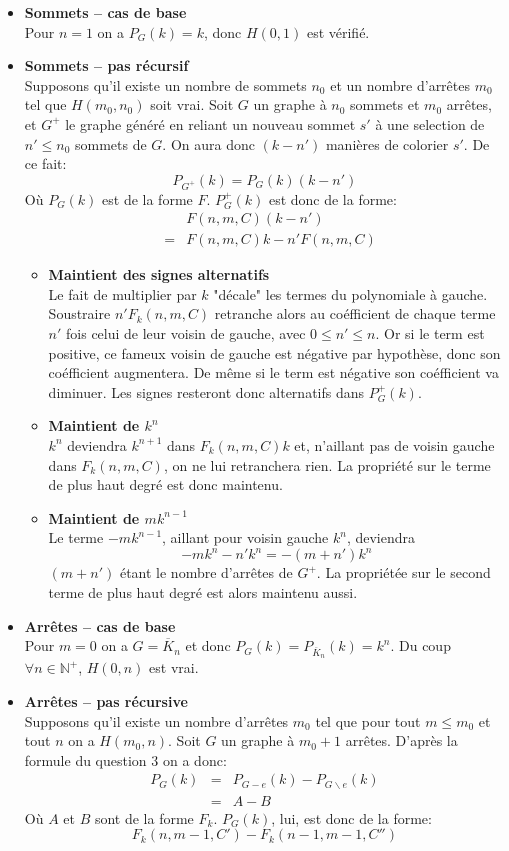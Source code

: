 \begin{itemize}
\item \textbf{Sommets -- cas de base} \\
Pour $n = 1$ on a $P_G(k) = k$, donc $H(0,1)$ est vérifié.
\item \textbf{Sommets -- pas récursif} \\ Supposons qu'il existe un nombre de sommets $n_0$ et un nombre d'arrêtes $m_0$ tel que $H(m_0,n_0)$ soit vrai. Soit $G$ un graphe à $n_0$ sommets et $m_0$ arrêtes, et $G^+$ le graphe généré en reliant un nouveau sommet $s'$ à une selection de $n' \leq n_0$ sommets de $G$. On aura donc $(k-n')$ manières de colorier $s'$. De ce fait:
\[ P_{G^+}(k) = P_G(k)(k-n') \]
Où $P_G(k)$ est de la forme $F$. $P_G^+(k)$ est donc de la forme:
\begin{eqnarray*}
&&	F(n,m,C)(k-n')			\\
&=& F(n,m,C)k - n'F(n,m,C)	
\end{eqnarray*} 
\begin{itemize}
\item \textbf{Maintient des signes alternatifs} \\ 
Le fait de multiplier par $k$ "décale" les termes du polynomiale à gauche. Soustraire $n'F_k(n,m,C)$ retranche alors au coéfficient de chaque terme $n'$ fois celui de leur voisin de gauche, avec $0 \leq n' \leq n$. Or si le term est positive, ce fameux voisin de gauche est négative par hypothèse, donc son coéfficient augmentera. De même si le term est négative son coéfficient va diminuer. Les signes resteront donc alternatifs dans $P_G^+(k)$.
\item \textbf{Maintient de $k^n$} \\
$k^{n}$ deviendra $k^{n+1}$ dans $F_k(n,m,C)k$ et, n'aillant pas de voisin gauche dans $F_k(n,m,C)$, on ne lui retranchera rien. La propriété sur le terme de plus haut degré est donc maintenu.
\item \textbf{Maintient de $mk^{n-1}$} \\
Le terme $-mk^{n-1}$, aillant pour voisin gauche $k^n$, deviendra \[-mk^n - n'k^n = -(m+n')k^n \] $(m+n')$ étant le nombre d'arrêtes de $G^+$. La propriétée sur le second terme de plus haut degré est alors maintenu aussi.
\end{itemize}

\item \textbf{Arrêtes -- cas de base} \\
Pour $m = 0$ on a $G = \overline{K}_n$ et donc $P_G(k) = P_{\overline{K}_n}(k) = k^n$. Du coup $\forall n \in \mathbb{N^+}$, $H(0,n)$ est vrai.
\item \textbf{Arrêtes -- pas récursive} \\
Supposons qu'il existe un nombre d'arrêtes $m_0$ tel que pour tout $m \leq m_0$ et tout $n$ on a $H(m_0,n)$. Soit $G$ un graphe à $m_0 + 1$ arrêtes. D'après la formule du question $3$ on a donc:
\begin{eqnarray*}
P_G(k) &=& P_{G-e}(k) - P_{G \backslash e}(k)	\\
		&=& A - B									
\end{eqnarray*}
Où $A$ et $B$ sont de la forme $F_k$. $P_G(k)$, lui, est donc de la forme:
\[ F_k(n,m-1,C') - F_k(n-1,m-1,C'') \]


\end{itemize}
